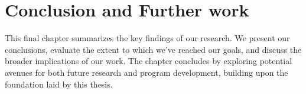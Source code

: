 \chapter{Conclusion and Further work}
\label{chap:conclusion}

This final chapter summarizes the key findings of our research. We present our conclusions, evaluate the extent to which we've reached our goals, and discuss the broader implications of our work. The chapter concludes by exploring potential avenues for both future research and program development, building upon the foundation laid by this thesis.



